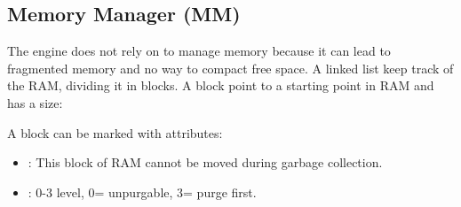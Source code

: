 \documentclass[book.tex]{subfiles}
\begin{document}
\subsection{Memory Manager (MM)}
The engine does not rely on  to manage memory because it can lead to fragmented memory and no way to compact free space. A linked list keep track of the RAM, dividing it in blocks. A block
point to a starting point in RAM and has a size:\\
 \par

 \par
A block can be marked with attributes:
\begin{itemize}
\item {} : This block of RAM cannot be moved during garbage collection.
\item {} : 0-3 level, 0= unpurgable, 3= purge first.
\end{itemize}
\end{document}
